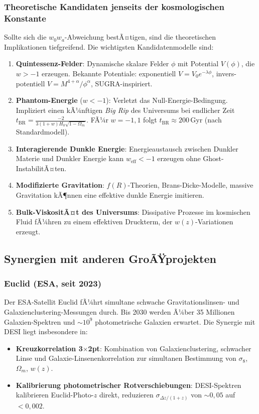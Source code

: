 ﻿\documentclass[a4paper,12pt]{article}
\theoremstyle{definition}
\theoremstyle{remark}
\begin{document}
\subsubsection*{Theoretische Kandidaten jenseits der kosmologischen Konstante}
Sollte sich die $w_0 w_a$-Abweichung bestÃ¤tigen, sind die theoretischen
Implikationen tiefgreifend. Die wichtigsten Kandidatenmodelle sind:

\begin{enumerate}[label=\arabic*.]
  \item \textbf{Quintessenz-Felder}: Dynamische skalare Felder $\phi$ mit Potential
    $V(\phi)$, die $w > -1$ erzeugen. Bekannte Potentiale: exponentiell
    $V = V_0 e^{-\lambda\phi}$, invers-potentiell $V = M^{4+\alpha}/\phi^\alpha$,
    SUGRA-inspiriert.
  \item \textbf{Phantom-Energie} ($w < -1$): Verletzt das Null-Energie-Bedingung.
    Impliziert einen kÃ¼nftigen \textit{Big Rip} des Universums bei endlicher Zeit
    $t_\mathrm{BR} = \frac{-2}{3(1+w)H_0\sqrt{1-\Omega_m}}$. FÃ¼r $w = -1{,}1$
    folgt $t_\mathrm{BR} \approx 200$\,Gyr (nach Standardmodell).
  \item \textbf{Interagierende Dunkle Energie}: Energieaustausch zwischen Dunkler
    Materie und Dunkler Energie kann $w_\mathrm{eff} < -1$ erzeugen ohne
    Ghost-InstabilitÃ¤ten.
  \item \textbf{Modifizierte Gravitation}: $f(R)$-Theorien, Brans-Dicke-Modelle,
    massive Gravitation kÃ¶nnen eine effektive dunkle Energie imitieren.
  \item \textbf{Bulk-ViskositÃ¤t des Universums}: Dissipative Prozesse im
    kosmischen Fluid fÃ¼hren zu einem effektiven Druckterm, der $w(z)$-Variationen
    erzeugt.
\end{enumerate}

\subsection{Synergien mit anderen GroÃŸprojekten}

\subsubsection*{Euclid (ESA, seit 2023)}
Der ESA-Satellit Euclid fÃ¼hrt simultane schwache Gravitationslinsen- und
Galaxienclus\-tering-Messungen durch. Bis 2030 werden Ã¼ber 35 Millionen
Galaxien-Spektren und $\sim 10^9$ photometrische Galaxien erwartet. Die
Synergie mit DESI liegt insbesondere in:
\begin{itemize}
  \item \textbf{Kreuzkorrelation 3$\times$2pt}: Kombination von
    Galaxienclustering, schwacher Linse und Galaxie-Linsenenkorrelation
    zur simultanen Bestimmung von $\sigma_8$, $\Omega_m$, $w(z)$.
  \item \textbf{Kalibrierung photometrischer Rotverschiebungen}: DESI-Spektren
    kalibrieren Euclid-Photo-$z$ direkt, reduzieren $\sigma_{\Delta z/(1+z)}$
    von $\sim 0{,}05$ auf $< 0{,}002$.
\end{itemize}
\end{document}
